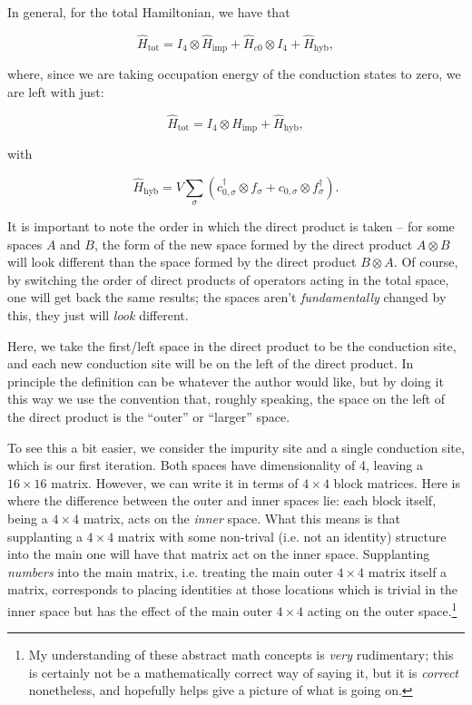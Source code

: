 In general, for the total Hamiltonian, we have that

\begin{equation}
  \hat{H}_{\mathrm{tot}} = I_4 \otimes \hat{H}_{\mathrm{imp}} + \hat{H}_{c0} \otimes I_4 + \hat{H}_{\mathrm{hyb}},
\end{equation}

where, since we are taking occupation energy of the conduction states to zero, we are left with just:

\begin{equation}
  \hat{H}_{\mathrm{tot}} = I_4 \otimes \hat{H}_{\mathrm{imp}} + \hat{H}_{\mathrm{hyb}},
\end{equation}

with

\begin{equation}
  \hat{H}_{\mathrm{hyb}} = V\sum_\sigma (c^\dagger_{0,\sigma} \otimes f_{\sigma} + c_{0,\sigma} \otimes f^\dagger_{\sigma}).
\end{equation}

It is important to note the order in which the direct product is taken -- for some spaces $A$ and $B$, the form of the new space formed by the direct product $A \otimes B$ will look different than the space formed by the direct product $B \otimes A$. Of course, by switching the order of direct products of operators acting in the total space, one will get back the same results; the spaces aren't \textit{fundamentally} changed by this, they just will \textit{look} different.

Here, we take the first/left space in the direct product to be the conduction site, and each new conduction site will be on the left of the direct product. In principle the definition can be whatever the author would like, but by doing it this way we use the convention that, roughly speaking, the space on the left of the direct product is the ``outer'' or ``larger'' space.

To see this a bit easier, we consider the impurity site and a single conduction site, which is our first iteration. Both spaces have dimensionality of 4, leaving a $16\times16$ matrix. However, we can write it in terms of $4\times4$ block matrices. Here is where the difference between the outer and inner spaces lie: each block itself, being a $4\times4$ matrix, acts on the \textit{inner} space. What this means is that supplanting a $4\times4$ matrix with some non-trival (i.e. not an identity) structure into the main one will have that matrix act on the inner space. Supplanting  \textit{numbers} into the main matrix, i.e. treating the main outer $4\times4$ matrix itself a matrix, corresponds to placing identities at those locations which is trivial in the inner space but has the effect of the main outer $4\times4$ acting on the outer space.\footnote{My understanding of these abstract math concepts is \textit{very} rudimentary; this is certainly not be a mathematically correct way of saying it, but it is \textit{correct} nonetheless, and hopefully helps give a picture of what is going on.}


